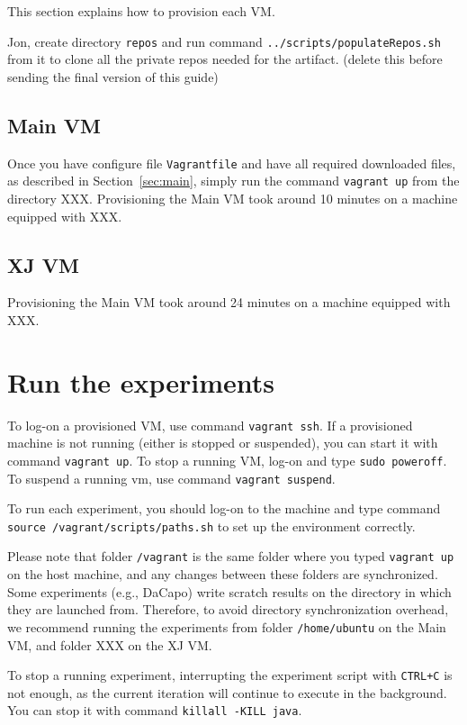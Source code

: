 \documentclass[12pt]{article}
\begin{document}
This section explains how to provision each VM.

Jon, create directory \texttt{repos} and run command
\texttt{../scripts/populateRepos.sh} from it to clone all the private repos
needed for the artifact. (delete this before sending the final version of this
guide)

\subsection{Main VM}

Once you have configure file \texttt{Vagrantfile} and have all required
downloaded files, as described in Section~\ref{sec:main}, simply run the command
\texttt{vagrant up} from the directory XXX.  Provisioning the Main VM took around 10
minutes on a machine equipped with XXX.

\subsection{XJ VM}

Provisioning the Main VM took around 24 minutes on a machine equipped with XXX.

\section{Run the experiments}

To log-on a provisioned VM, use command \texttt{vagrant ssh}.  If a provisioned
machine is not running (either is stopped or suspended), you can start it with
command \texttt{vagrant up}.  To stop a running VM, log-on and type \texttt{sudo
poweroff}.  To suspend a running vm, use command \texttt{vagrant suspend}.

To run each experiment, you should log-on to the machine and type command
\texttt{source /vagrant/scripts/paths.sh} to set up the environment correctly.

Please note that folder \texttt{/vagrant} is the same folder where you typed
\texttt{vagrant up} on the host machine, and any changes between these folders
are synchronized.  Some experiments (e.g., DaCapo) write scratch results on the
directory in which they are launched from.  Therefore, to avoid directory
synchronization overhead, we recommend running the experiments from folder
\texttt{/home/ubuntu} on the Main VM, and folder XXX on the XJ VM.

To stop a running experiment, interrupting the experiment script with
\texttt{CTRL+C} is not enough, as the current iteration will continue to execute
in the background.  You can stop it with command \texttt{killall -KILL java}.
\end{document}
